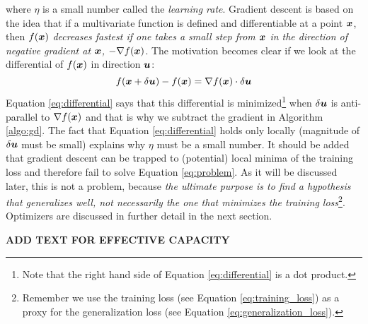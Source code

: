 \noindent where $\eta$ is a small number called the \emph{learning
rate}. Gradient descent is based on the idea that
if a multivariate function is defined and differentiable at a point $\boldsymbol{x}$, then
$f(\boldsymbol{x})$ \emph{decreases fastest if one takes a small step from $\boldsymbol{x}$ in the
direction of negative gradient at $\boldsymbol{x}$, $-\nabla f(\boldsymbol{x})$}. The motivation
becomes clear if we look at the differential of $f(\boldsymbol{x})$ in direction $\boldsymbol{u}$:
\begin{equation}
	\label{eq:differential}
	f(\boldsymbol{x} + \delta \boldsymbol{u}) - f(\boldsymbol{x}) = \nabla f(\boldsymbol{x}) \cdot \delta \boldsymbol{u}
\end{equation}
Equation \ref{eq:differential} says that this differential is
minimized\footnote{Note that the right hand side of Equation
\ref{eq:differential} is a dot product.} when $\delta \boldsymbol{u}$ is anti-parallel
to $\nabla f(\boldsymbol{x})$ and that is why we subtract the gradient in Algorithm
\ref{algo:gd}. The fact that Equation \ref{eq:differential} holds only locally
(magnitude of $\delta \boldsymbol{u}$ must be small) explains why $\eta$ must be a small
number. It should be added that gradient descent can be trapped to (potential)
local minima of the training loss and therefore fail to solve Equation
\ref{eq:problem}. As it will be discussed later, this is not a problem, because
\emph{the ultimate purpose is to find a hypothesis that generalizes well, not
necessarily the one that minimizes the training loss}\footnote{Remember we use
the training loss (see Equation \ref{eq:training_loss}) as a proxy for the
generalization loss (see Equation \ref{eq:generalization_loss}).}. Optimizers are
discussed in further detail in the next section.

\textbf{ADD TEXT FOR EFFECTIVE CAPACITY}

